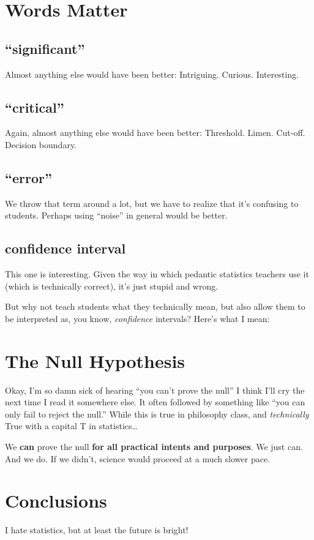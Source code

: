 \documentclass[
]{book}
\begin{document}
\hypertarget{words}{%
\chapter{Words Matter}\label{words}}

\hypertarget{significant}{%
\section{``significant''}\label{significant}}

Almost anything else would have been better:
Intriguing. Curious. Interesting.

\hypertarget{critical}{%
\section{``critical''}\label{critical}}

Again, almost anything else would have been better:
Threshold. Limen. Cut-off. Decision boundary.

\hypertarget{error}{%
\section{``error''}\label{error}}

We throw that term around a lot, but we have to realize that it's confusing to students. Perhaps using ``noise'' in general would be better.

\hypertarget{confidence-interval}{%
\section{confidence interval}\label{confidence-interval}}

This one is interesting. Given the way in which pedantic statistics teachers use it (which is technically correct), it's just stupid and wrong.

But why not teach students what they technically mean, but also allow them to be interpreted as, you know, \emph{confidence} intervals? Here's what I mean:

\hypertarget{null}{%
\chapter{The Null Hypothesis}\label{null}}

Okay, I'm so damn sick of hearing ``you can't prove the null'' I think I'll cry the next time I read it somewhere else. It often followed by something like ``you can only fail to reject the null.'' While this is true in philosophy class, and \emph{technically} True with a capital T in statistics\ldots{}

We \textbf{can} prove the null \textbf{for all practical intents and purposes}. We just can. And we do. If we didn't, science would proceed at a much slower pace.

\hypertarget{concl}{%
\chapter{Conclusions}\label{concl}}

I hate statistics, but at least the future is bright!

  
\end{document}
